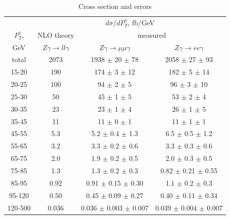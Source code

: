   \begin{table}[h]
  \scriptsize
  \begin{center}
  \caption{Cross section and errors}
  \begin{tabular}{|c|c|c|c|}
                     & \multicolumn{3}{|c|}{$d\sigma/dP_{T}^{\gamma}$, fb/GeV} \\ 
     $P_T^{\gamma}$, & NLO theory                          &  \multicolumn{2}{|c|}{measured}      \\
    GeV              &  $Z\gamma\rightarrow ll\gamma$ & $Z\gamma\rightarrow \mu\mu\gamma$  & $Z\gamma\rightarrow ee\gamma$    \\ \hline
    total & 2073 & 1938 $\pm$ 20 $\pm$ 78 & 2058 $\pm$ 27 $\pm$ 93\\ \hline
    15-20 & 190 & 174 $\pm$ 3 $\pm$ 12 & 182 $\pm$ 5 $\pm$ 14\\ \hline
    20-25 & 100 & 94 $\pm$ 2 $\pm$ 5 & 96 $\pm$ 3 $\pm$ 10\\ \hline
    25-30 & 50 & 45 $\pm$ 1 $\pm$ 5 & 53 $\pm$ 2 $\pm$ 4\\ \hline
    30-35 & 23 & 23 $\pm$ 1 $\pm$ 4 & 26 $\pm$ 1 $\pm$ 5\\ \hline
    35-45 & 11 & 11 $\pm$ 0 $\pm$ 1 & 11 $\pm$ 1 $\pm$ 1\\ \hline
    45-55 & 5.3 & 5.2 $\pm$ 0.4 $\pm$ 1.3 & 6.5 $\pm$ 0.5 $\pm$ 1.2\\ \hline
    55-65 & 3.2 & 3.3 $\pm$ 0.2 $\pm$ 0.6 & 3.3 $\pm$ 0.3 $\pm$ 0.6\\ \hline
    65-75 & 2.0 & 1.9 $\pm$ 0.2 $\pm$ 0.5 & 2.0 $\pm$ 0.3 $\pm$ 0.5\\ \hline
    75-85 & 1.3 & 1.3 $\pm$ 0.2 $\pm$ 0.3  & 0.82 $\pm$ 0.21 $\pm$ 0.55\\ \hline
    85-95 & 0.92 & 0.91 $\pm$ 0.15 $\pm$ 0.30 & 1.1 $\pm$ 0.2 $\pm$ 0.3 \\ \hline
    95-120 & 0.50 & 0.45 $\pm$ 0.09 $\pm$ 0.27 & 0.40 $\pm$ 0.11 $\pm$ 0.34\\ \hline
    120-500 & 0.036 & 0.036 $\pm$ 0.003 $\pm$ 0.007 & 0.039 $\pm$ 0.004 $\pm$ 0.007 \\ \hline
  \end{tabular}
  \label{tab:cs_mc_vs_meas_ZGamma}
  \end{center}
\end{table}
